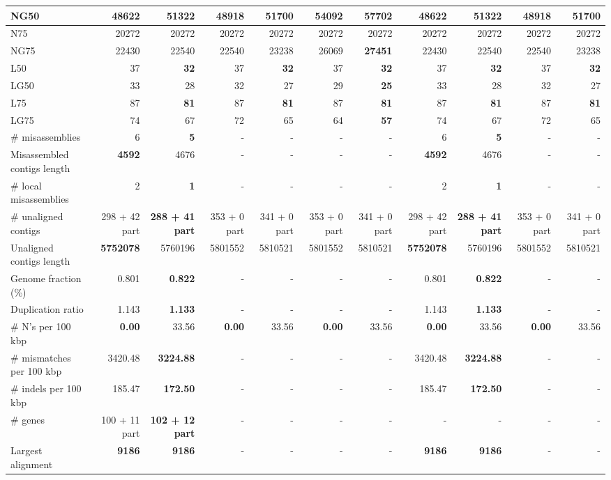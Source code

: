\documentclass[12pt,a4paper]{article}
\begin{document}
\begin{table}[ht]
\begin{center}
\begin{tabular}{|l*{10}{|r}|}
NG50 & 48622 & 51322 & 48918 & 51700 & 54092 & {\bf 57702} & 48622 & 51322 & 48918 & 51700 \\ \hline
N75 & 20272 & 20272 & 20272 & 20272 & 20272 & 20272 & 20272 & 20272 & 20272 & 20272 \\ \hline
NG75 & 22430 & 22540 & 22540 & 23238 & 26069 & {\bf 27451} & 22430 & 22540 & 22540 & 23238 \\ \hline
L50 & 37 & {\bf 32} & 37 & {\bf 32} & 37 & {\bf 32} & 37 & {\bf 32} & 37 & {\bf 32} \\ \hline
LG50 & 33 & 28 & 32 & 27 & 29 & {\bf 25} & 33 & 28 & 32 & 27 \\ \hline
L75 & 87 & {\bf 81} & 87 & {\bf 81} & 87 & {\bf 81} & 87 & {\bf 81} & 87 & {\bf 81} \\ \hline
LG75 & 74 & 67 & 72 & 65 & 64 & {\bf 57} & 74 & 67 & 72 & 65 \\ \hline
\# misassemblies & 6 & {\bf 5} & - & - & - & - & 6 & {\bf 5} & - & - \\ \hline
Misassembled contigs length & {\bf 4592} & 4676 & - & - & - & - & {\bf 4592} & 4676 & - & - \\ \hline
\# local misassemblies & 2 & {\bf 1} & - & - & - & - & 2 & {\bf 1} & - & - \\ \hline
\# unaligned contigs & 298 + 42 part & {\bf 288 + 41 part} & 353 + 0 part & 341 + 0 part & 353 + 0 part & 341 + 0 part & 298 + 42 part & {\bf 288 + 41 part} & 353 + 0 part & 341 + 0 part \\ \hline
Unaligned contigs length & {\bf 5752078} & 5760196 & 5801552 & 5810521 & 5801552 & 5810521 & {\bf 5752078} & 5760196 & 5801552 & 5810521 \\ \hline
Genome fraction (\%) & 0.801 & {\bf 0.822} & - & - & - & - & 0.801 & {\bf 0.822} & - & - \\ \hline
Duplication ratio & 1.143 & {\bf 1.133} & - & - & - & - & 1.143 & {\bf 1.133} & - & - \\ \hline
\# N's per 100 kbp & {\bf 0.00} & 33.56 & {\bf 0.00} & 33.56 & {\bf 0.00} & 33.56 & {\bf 0.00} & 33.56 & {\bf 0.00} & 33.56 \\ \hline
\# mismatches per 100 kbp & 3420.48 & {\bf 3224.88} & - & - & - & - & 3420.48 & {\bf 3224.88} & - & - \\ \hline
\# indels per 100 kbp & 185.47 & {\bf 172.50} & - & - & - & - & 185.47 & {\bf 172.50} & - & - \\ \hline
\# genes & 100 + 11 part & {\bf 102 + 12 part} & - & - & - & - & - & - & - & - \\ \hline
Largest alignment & {\bf 9186} & {\bf 9186} & - & - & - & - & {\bf 9186} & {\bf 9186} & - & - \\ \hline
\end{tabular}
\end{center}
\end{table}
\end{document}
